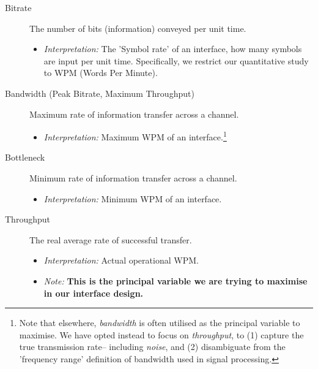 \documentclass[logo,bsc,singlespacing,parskip]{infthesis}
\begin{document}
{ %
\begin{mdframed}
\begin{description}
\item[{Bitrate\label{bitrate}}] The number of bits (information) conveyed per unit time.
\begin{itemize}
\item \emph{Interpretation:} The 'Symbol rate' of an interface, how many symbols are input per unit time. 
Specifically, we restrict our quantitative study to WPM (Words Per Minute).
\end{itemize}
\end{description}
\end{mdframed}

\begin{mdframed}
\begin{description}
\item[{Bandwidth\label{bandwidth} (Peak Bitrate, Maximum Throughput)}] Maximum rate of information transfer across a channel.
\begin{itemize}
\item \emph{Interpretation:} Maximum WPM of an interface.\footnote{Note that elsewhere, \emph{bandwidth} is often utilised as the principal variable to maximise. We have opted instead to focus on \emph{throughput}, to (1) capture the true transmission rate-- including \emph{noise}, and (2) disambiguate from the 'frequency range' definition of bandwidth used in signal processing.}
\end{itemize}
\end{description}
\end{mdframed}

\begin{mdframed}
\begin{description}
\item[{Bottleneck\label{bottleneck}}] Minimum rate of information transfer across a channel.
\begin{itemize}
\item \emph{Interpretation:} Minimum WPM of an interface.
\end{itemize}
\end{description}
\end{mdframed}

\begin{mdframed}
\begin{description}
\item[{Throughput}] The real average rate of successful transfer.
\begin{itemize}
\item \emph{Interpretation:} Actual operational WPM.
\item \emph{Note:} \textbf{This is the principal variable we are trying to maximise in our interface design.}
\end{itemize}
\end{description}
\end{mdframed}

}
\end{document}
